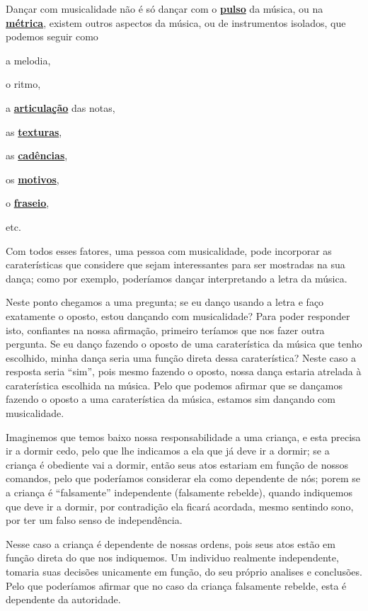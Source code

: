 Dançar com musicalidade não é só dançar com o \hyperref[ref:Pulso]{\textbf{pulso}} da música, 
ou na \hyperref[def:Metrica]{\textbf{métrica}},
existem outros aspectos da música, ou de instrumentos isolados, que podemos seguir como 
\begin{inparaitem} 
\item a melodia, 
\item o ritmo,
\item a \hyperref[sub:Articulation]{\textbf{articulação}} das notas, 
\item as \hyperref[sec:texturasmusica]{\textbf{texturas}}, 
\item as \hyperref[sec:Cadencia]{\textbf{cadências}}, 
\item os \hyperref[sec:Motivo]{\textbf{motivos}}, 
\item o \hyperref[sec:fraseio]{\textbf{fraseio}}, 
\item etc.
\end{inparaitem} 
Com todos esses fatores, uma pessoa com musicalidade, 
pode incorporar as caraterísticas que considere que sejam interessantes para 
ser mostradas na sua dança; como por exemplo, poderíamos dançar interpretando a letra da música.

Neste ponto chegamos a uma pregunta; se eu danço usando a letra e faço exatamente o oposto,
estou dançando com musicalidade?
Para poder responder isto, confiantes na nossa afirmação,
primeiro teríamos que nos fazer outra pergunta.
Se eu danço fazendo o oposto de uma caraterística da música que tenho escolhido,
minha dança seria uma função direta dessa caraterística?
Neste caso a resposta seria ``sim'', pois mesmo fazendo o oposto,
nossa dança estaria atrelada à caraterística escolhida na música.
Pelo que podemos afirmar que se dançamos fazendo o oposto a uma caraterística da música, 
estamos sim dançando com musicalidade.
\begin{example}
Imaginemos que temos baixo nossa responsabilidade a uma criança,
e esta precisa ir a dormir cedo, pelo que lhe indicamos a ela que já deve ir a dormir;
se a criança é obediente vai a dormir, então seus atos estariam em função de nossos comandos,
pelo que poderíamos considerar ela como dependente de nós;
porem se a criança é ``falsamente'' independente (falsamente rebelde), quando indiquemos que deve ir a dormir,
por contradição ela ficará acordada, mesmo sentindo sono, por ter um falso senso de independência.

Nesse caso a criança é dependente de nossas ordens,
pois seus atos estão em função direta do que nos indiquemos.
Um individuo realmente independente, tomaria suas decisões unicamente em função,
do seu próprio analises e conclusões.
Pelo que poderíamos afirmar que no caso da criança falsamente rebelde, esta é dependente da autoridade.
\end{example}

